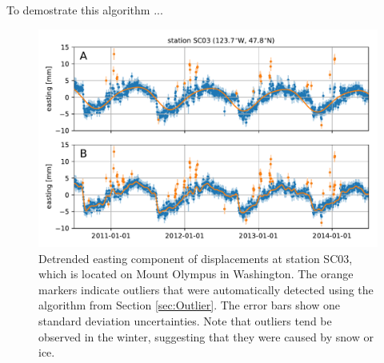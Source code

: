 \documentclass[extra,mreferee]{gji}
\begin{document}
To demostrate this algorithm ...

\begin{figure}
\includegraphics{figures/outliers_new/outliers.pdf}
\caption{Detrended easting component of displacements at station SC03, which is located on Mount Olympus in Washington. The orange markers indicate outliers that were automatically detected using the algorithm from Section \ref{sec:Outlier}. The error bars show one standard deviation uncertainties. Note that outliers tend be observed in the winter, suggesting that they were caused by snow or ice.}   
\label{fig:Outliers}
\end{figure}


  
\end{document}
